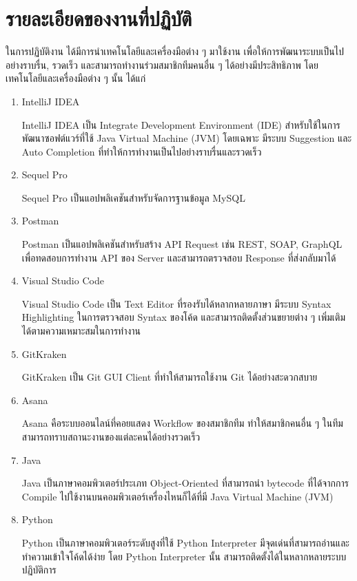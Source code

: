 \section{รายละเอียดของงานที่ปฏิบัติ}
ในการปฏิบัติงาน ได้มีการนำเทคโนโลยีและเครื่องมือต่าง ๆ มาใช้งาน เพื่อให้การพัฒนาระบบเป็นไปอย่างราบรื่น, รวดเร็ว และสามารถทำงานร่วมสมาชิกทีมคนอื่น ๆ ได้อย่างมีประสิทธิภาพ  โดยเทคโนโลยีและเครื่องมือต่าง ๆ นั้น ได้แก่
\begin{enumerate}
	\item IntelliJ IDEA
	
	IntelliJ IDEA เป็น Integrate Development Environment (IDE) สำหรับใช้ในการพัฒนาซอฟต์แวร์ที่ใช้ Java Virtual Machine (JVM) โดยเฉพาะ มีระบบ Suggestion และ Auto Completion ที่ทำให้การทำงานเป็นไปอย่างราบรื่นและรวดเร็ว
	
	\item Sequel Pro
	
	Sequel Pro เป็นแอปพลิเคชันสำหรับจัดการฐานข้อมูล MySQL
	
	\item Postman
	
	Postman เป็นแอปพลิเคชันสำหรับสร้าง API Request เช่น REST, SOAP, GraphQL เพื่อทดสอบการทำงาน API ของ Server และสามารถตรวจสอบ Response ที่ส่งกลับมาได้
	
	\item Visual Studio Code
	
	Visual Studio Code เป็น Text Editor ที่รองรับได้หลากหลายภาษา มีระบบ Syntax Highlighting ในการตรวจสอบ Syntax ของโค้ด และสามารถติดตั้งส่วนขยายต่าง ๆ เพิ่มเติมได้ตามความเหมาะสมในการทำงาน
	
	\item GitKraken
	
	GitKraken เป็น Git GUI Client ที่ทำให้สามารถใช้งาน Git ได้อย่างสะดวกสบาย
	
	\item Asana
	
	Asana คือระบบออนไลน์ที่คอยแสดง Workflow ของสมาชิกทีม ทำให้สมาชิกคนอื่น ๆ ในทีมสามารถทราบสถานะงานของแต่ละคนได้อย่างรวดเร็ว
	
	\item Java
	
	Java เป็นภาษาคอมพิวเตอร์ประเภท Object-Oriented ที่สามารถนำ bytecode ที่ได้จากการ Compile ไปใช้งานบนคอมพิวเตอร์เครื่องไหนก็ได้ที่มี Java Virtual Machine (JVM)
	
	\item Python
	
	Python เป็นภาษาคอมพิวเตอร์ระดับสูงที่ใช้ Python Interpreter มีจุดเด่นที่สามารถอ่านและทำความเข้าใจโค้ดได้ง่าย โดย Python Interpreter นั้น สามารถติดตั้งได้ในหลากหลายระบบปฏิบัติการ 
	

\end{enumerate}
